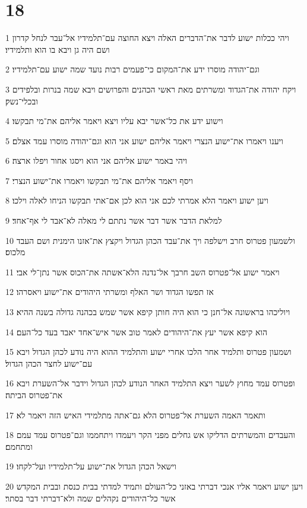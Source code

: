 \chapter{18}

\par 1 ויהי ככלות ישוע לדבר את־הדברים האלה ויצא החוצה עם־תלמידיו אל־עבר לנחל קדרון ושם היה גן ויבא בו הוא ותלמידיו׃
\par 2 וגם־יהודה מוסרו ידע את־המקום כי־פעמים רבות נועד שמה ישוע עם־תלמידיו׃
\par 3 ויקח יהודה את־הגדוד ומשרתים מאת ראשי הכהנים והפרושים ויבא שמה בנרות ובלפידים ובכלי־נשק׃
\par 4 וישוע ידע את כל־אשר יבא עליו ויצא ויאמר אליהם את־מי תבקשו׃
\par 5 ויענו ויאמרו את־ישוע הנצרי ויאמר אליהם ישוע אני הוא וגם־יהודה מוסרו עמד אצלם׃
\par 6 ויהי באמר ישוע אליהם אני הוא ויסגו אחור ויפלו ארצה׃
\par 7 ויסף ויאמר אליהם את־מי תבקשו ויאמרו את־ישוע הנצרי׃
\par 8 ויען ישוע ויאמר הלא אמרתי לכם אני הוא לכן אם־אתי תבקשו הניחו לאלה וילכו׃
\par 9 למלאת הדבר אשר דבר אשר נתתם לי מאלה לא־אבד לי אף־אחד׃
\par 10 ולשמעון פטרוס חרב וישלפה ויך את־עבד הכהן הגדול ויקצץ את־אזנו הימנית ושם העבד מלכוס׃
\par 11 ויאמר ישוע אל־פטרוס השב חרבך אל־נדנה הלא־אשתה את־הכוס אשר נתן־לי אבי׃
\par 12 אז תפשו הגדוד ושר האלף ומשרתי היהודים את־ישוע ויאסרהו׃
\par 13 ויוליכהו בראשונה אל־חנן כי הוא היה חותן קיפא אשר שמש בכהנה גדולה בשנה ההיא׃
\par 14 הוא קיפא אשר יעץ את־היהודים לאמר טוב אשר איש־אחד יאבד בעד כל־העם׃
\par 15 ושמעון פטרוס ותלמיד אחר הלכו אחרי ישוע והתלמיד ההוא היה נודע לכהן הגדול ויבא עם־ישוע לחצר הכהן הגדול׃
\par 16 ופטרוס עמד מחוץ לשער ויצא התלמיד האחר הנודע לכהן הגדול וידבר אל־השערת ויבא את־פטרוס הביתה׃
\par 17 ותאמר האמה השערת אל־פטרוס הלא גם־אתה מתלמידי האיש הזה ויאמר לא׃
\par 18 והעבדים והמשרתים הדליקו אש גחלים מפני הקר ויעמדו ויתחממו וגם־פטרוס עמד עמם ומתחמם׃
\par 19 וישאל הכהן הגדול את־ישוע על־תלמידיו ועל־לקחו׃
\par 20 ויען ישוע ויאמר אליו אנכי דברתי באזני כל־העולם ותמיד למדתי בבית כנסת ובבית המקדש אשר כל־היהודים נקהלים שמה ולא־דברתי דבר בסתר׃
